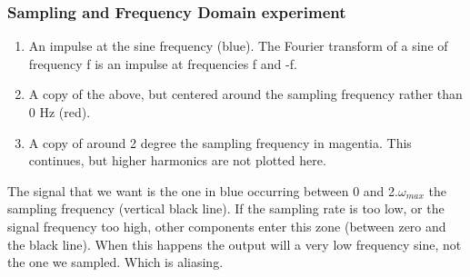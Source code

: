 \documentclass{article}
\begin{document}
\subsubsection{Sampling and Frequency Domain experiment }

\begin{enumerate}

    \item An impulse at the sine frequency (blue). The Fourier transform of a sine of frequency f is an impulse at frequencies f and -f.
    
    \item A copy of the above, but centered around the sampling frequency rather than 0 Hz (red).
    
    \item A copy of around 2 degree the sampling frequency in magentia. This continues, but higher harmonics are not plotted here.
\end{enumerate}


The signal that we want is the one in blue occurring between 0 and 2.$ \omega_{max} $ the sampling frequency (vertical black line). If the sampling rate is too low, or the signal frequency too high, other components enter this zone (between zero and the black line). When this happens the output will a very low frequency sine, not the one we sampled. Which is aliasing. 
\end{document}
